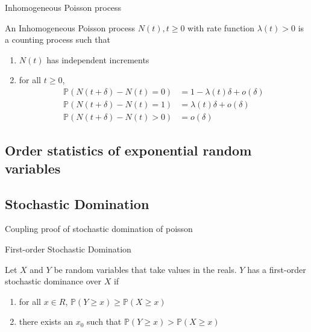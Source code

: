 \begin{definition}
	Inhomogeneous Poisson process

	\noindent
	An Inhomogeneous Poisson process ${N(t), t \geq 0}$ with rate function $\lambda(t) > 0$ is a counting process such that
	\begin{enumerate}
		\item $N(t)$ has independent increments
		\item for all $t \geq 0$, 
		\begin{align*}
			\mathbb{P}(N(t + \delta) - N(t) = 0) &= 1 - \lambda(t)\delta + o(\delta) \\
			\mathbb{P}(N(t + \delta) - N(t) = 1) &= \lambda(t)\delta + o(\delta) \\
			\mathbb{P}(N(t + \delta) - N(t) > 0) &= o(\delta)
		\end{align*}
	\end{enumerate}
\end{definition}


\subsection{Order statistics of exponential random variables}

\begin{theorem}
	
\end{theorem}



\subsection{Stochastic Domination}
Coupling proof of stochastic domination of poisson 

\begin{definition}
	First-order Stochastic Domination

	\noindent
	Let $X$ and $Y$ be random variables that take values in the reals. $Y$ has a first-order stochastic dominance over $X$ if \begin{enumerate}
		\item for all $x \in R$, $\mathbb{P}(Y \geq x) \geq \mathbb{P}(X \geq x)$
		\item there exists an $x_0$ such that $\mathbb{P}(Y \geq x) > \mathbb{P}(X \geq x)$
	\end{enumerate}
\end{definition}




